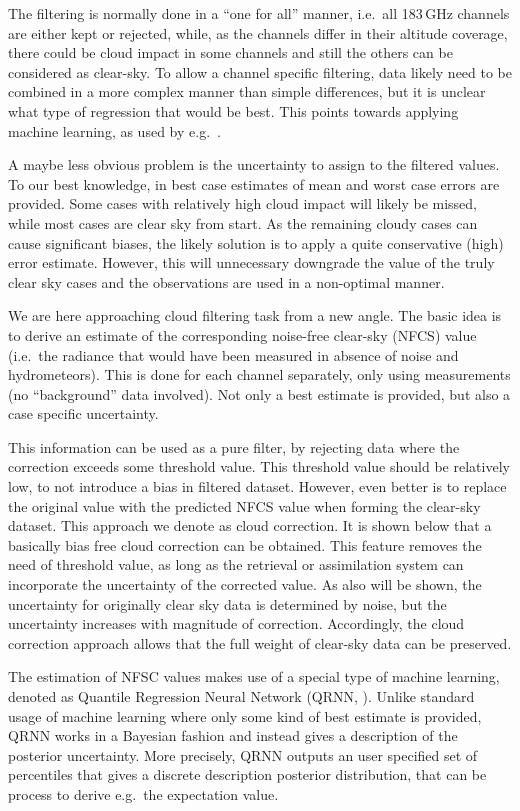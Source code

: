 \documentclass[amt, manuscript]{copernicus}
\begin{document}
The filtering is normally done in a ``one for all'' manner, i.e.\ all 183\,GHz
channels are either kept or rejected, while, as the channels differ in their
altitude coverage, there could be cloud impact in some channels and still the
others can be considered as clear-sky. To allow a channel specific filtering,
data likely need to be combined in a more complex manner than simple
differences, but it is unclear what type of regression that would be best. This
points towards applying machine learning, as used by e.g.\
\citet{favrichon2019detecting}.

A maybe less obvious problem is the uncertainty to assign to the filtered
values. To our best knowledge, in best case estimates of mean and worst case
errors are provided. Some cases with relatively high cloud impact will likely be
missed, while most cases are clear sky from start. As the remaining cloudy
cases can cause significant biases, the likely solution is to apply a quite
conservative (high) error estimate. However, this will unnecessary downgrade
the value of the truly clear sky cases and the observations are used in a
non-optimal manner.

We are here approaching cloud filtering task from a new angle. The basic idea
is to derive an estimate of the corresponding noise-free clear-sky (NFCS) value
(i.e.\ the radiance that would have been measured in absence of noise and
hydrometeors). This is done for each channel separately, only using
measurements (no ``background'' data involved). Not only a best estimate is
provided, but also a case specific uncertainty.

This information can be used as a pure filter, by rejecting data where the
correction exceeds some threshold value. This threshold value should be
relatively low, to not introduce a bias in filtered dataset. However, even
better is to replace the original value with the predicted NFCS value when
forming the clear-sky dataset. This approach we denote as cloud correction. It
is shown below that a basically bias free cloud correction can be obtained.
This feature removes the need of threshold value, as long as the retrieval or
assimilation system can incorporate the uncertainty of the corrected value. As
also will be shown, the uncertainty for originally clear sky data is determined
by noise, but the uncertainty increases with magnitude of correction.
Accordingly, the cloud correction approach allows that the full weight of
clear-sky data can be preserved.

The estimation of NFSC values makes use of a special type of machine learning,
denoted as Quantile Regression Neural Network (QRNN,
\citet{pfreundschuh:aneur:18}). Unlike standard usage of machine learning where
only some kind of best estimate is provided, QRNN works in a Bayesian fashion
and instead gives a description of the posterior uncertainty. More precisely,
QRNN outputs an user specified set of percentiles that gives a discrete
description posterior distribution, that can be process to derive e.g.\ the
expectation value.
\end{document}
